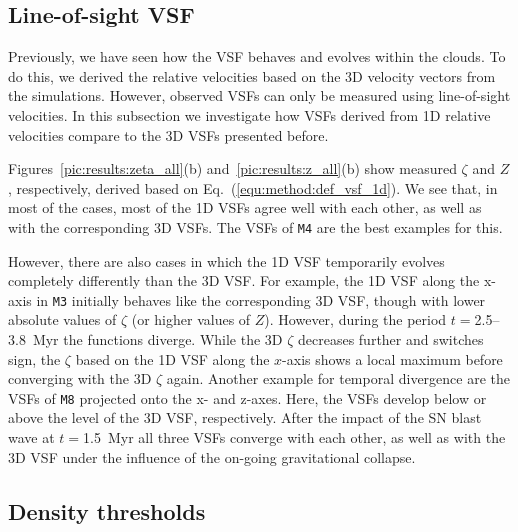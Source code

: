 \documentclass{aa}		%
\begin{document}
\subsection{Line-of-sight VSF}\label{results:1d}

Previously, we have seen how the VSF behaves and evolves within the clouds.
To do this, we derived the relative velocities based on the 3D velocity vectors from the simulations.
However, observed VSFs can only be measured using line-of-sight velocities.
In this subsection we investigate how VSFs derived from 1D relative velocities compare to the 3D VSFs presented before.

Figures~\ref{pic:results:zeta_all}(b) and~\ref{pic:results:z_all}(b) show measured $\zeta$ and $Z$, respectively, derived based on Eq.~(\ref{equ:method:def_vsf_1d}). 
We see that, in most of the cases, most of the 1D VSFs agree well with each other, as well as with the corresponding 3D VSFs.
The VSFs of \texttt{M4} are the best examples for this.

However, there are also cases in which the 1D VSF temporarily evolves completely differently than the 3D VSF.
For example, the 1D VSF along the x-axis in \texttt{M3} initially behaves like the corresponding 3D VSF, though with lower absolute values of $\zeta$ (or higher values of $Z$).
However, during the period $t=$2.5--3.8~Myr the functions diverge. 
While the 3D $\zeta$ decreases further and switches sign, the $\zeta$ based on the 1D VSF along the $x$-axis shows a local maximum before converging with the 3D $\zeta$ again. 
Another example for temporal divergence are the VSFs of \texttt{M8} projected onto the x- and z-axes. 
Here, the VSFs develop below or above the level of the 3D VSF, respectively.
After the impact of the SN blast wave at $t=$1.5~Myr all three VSFs converge with each other, as well as with the 3D VSF under the influence of the on-going gravitational collapse.



\subsection{Density thresholds}\label{results:densthres}
\end{document}
